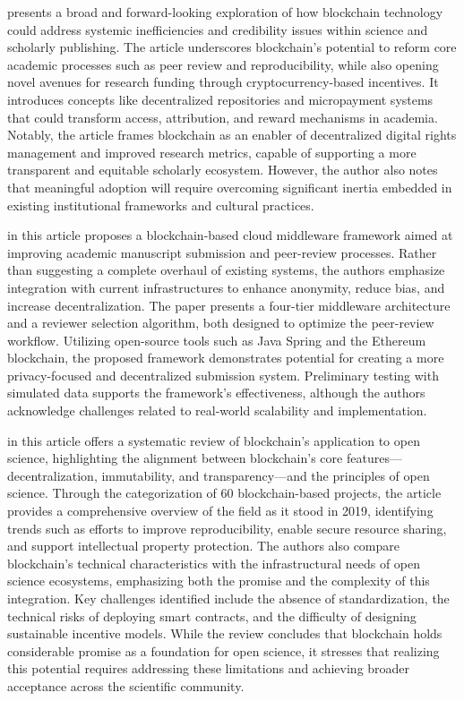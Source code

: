 \documentclass{article}
\begin{document}
\cite{van_rossum_blockchain_2018} presents a broad and forward-looking exploration of how blockchain technology could address systemic inefficiencies and credibility issues within science and scholarly publishing. The article underscores blockchain’s potential to reform core academic processes such as peer review and reproducibility, while also opening novel avenues for research funding through cryptocurrency-based incentives. It introduces concepts like decentralized repositories and micropayment systems that could transform access, attribution, and reward mechanisms in academia. Notably, the article frames blockchain as an enabler of decentralized digital rights management and improved research metrics, capable of supporting a more transparent and equitable scholarly ecosystem. However, the author also notes that meaningful adoption will require overcoming significant inertia embedded in existing institutional frameworks and cultural practices.

\cite{gazis_blockchain_2022} in this article proposes a blockchain-based cloud middleware framework aimed at improving academic manuscript submission and peer-review processes. Rather than suggesting a complete overhaul of existing systems, the authors emphasize integration with current infrastructures to enhance anonymity, reduce bias, and increase decentralization. The paper presents a four-tier middleware architecture and a reviewer selection algorithm, both designed to optimize the peer-review workflow. Utilizing open-source tools such as Java Spring and the Ethereum blockchain, the proposed framework demonstrates potential for creating a more privacy-focused and decentralized submission system. Preliminary testing with simulated data supports the framework’s effectiveness, although the authors acknowledge challenges related to real-world scalability and implementation.

\cite{leible_review_2019} in this article offers a systematic review of blockchain’s application to open science, highlighting the alignment between blockchain’s core features—decentralization, immutability, and transparency—and the principles of open science. Through the categorization of 60 blockchain-based projects, the article provides a comprehensive overview of the field as it stood in 2019, identifying trends such as efforts to improve reproducibility, enable secure resource sharing, and support intellectual property protection. The authors also compare blockchain’s technical characteristics with the infrastructural needs of open science ecosystems, emphasizing both the promise and the complexity of this integration. Key challenges identified include the absence of standardization, the technical risks of deploying smart contracts, and the difficulty of designing sustainable incentive models. While the review concludes that blockchain holds considerable promise as a foundation for open science, it stresses that realizing this potential requires addressing these limitations and achieving broader acceptance across the scientific community.
\end{document}
